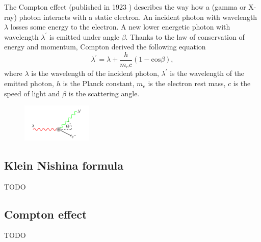 {  The Compton effect (published in 1923 \cite{}) describes the way how a (gamma or X-ray) photon interacts with a static electron. An incident photon with wavelength $\lambda$ losses some energy to the electron. A new lower energetic photon with wavelength $\lambda^{\prime}$ is emitted under angle $\beta$. Thanks to the law of conservation of energy and momentum, Compton derived the following equation
  \begin{equation}
      \lambda^{\prime} = \lambda + \frac{h}{m_{e}c}(1-\mathrm{cos} \beta),
  \end{equation}
  where $\lambda$ is the wavelength of the incident photon, $\lambda^{\prime}$ is the wavelength of the emitted photon, $h$ is the Planck constant, $m_{e}$ is the electron rest mass, $c$ is the speed of light and $\beta$ is the scattering angle.

  \begin{figure}[!h]
      \centering
      \includegraphics[width=0.3\textwidth]{./fig/photos/scattering.png}
  \end{figure}


  \subsection{Klein Nishina formula}
  TODO

  \subsection{Compton effect}
  TODO


}
